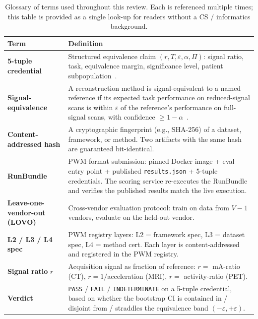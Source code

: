 \documentclass[twoside,11pt]{article}
\begin{document}
\begin{table}[ht]
    \centering
    \small
    \setlength{\tabcolsep}{6pt}
    \begin{tabular}{lp{10cm}}
        \toprule
        \textbf{Term} & \textbf{Definition} \\
        \midrule
        \textbf{5-tuple credential}     & Structured equivalence claim $(r, T, \varepsilon, \alpha, \Pi)$: signal ratio, task, equivalence margin, significance level, patient subpopulation~\citep{ws2framework}. \\
        \textbf{Signal-equivalence}     & A reconstruction method is signal-equivalent to a named reference if its expected task performance on reduced-signal scans is within $\varepsilon$ of the reference's performance on full-signal scans, with confidence $\geq 1-\alpha$~\citep{ws2framework}. \\
        \textbf{Content-addressed hash} & A cryptographic fingerprint (e.g., SHA-256) of a dataset, framework, or method. Two artifacts with the same hash are guaranteed bit-identical. \\
        \textbf{RunBundle}              & PWM-format submission: pinned Docker image + eval entry point + published \texttt{results.json} + 5-tuple credentials. The scoring service re-executes the RunBundle and verifies the published results match the live execution. \\
        \textbf{Leave-one-vendor-out (LOVO)} & Cross-vendor evaluation protocol: train on data from $V - 1$ vendors, evaluate on the held-out vendor. \\
        \textbf{L2 / L3 / L4 spec}      & PWM registry layers: L2 = framework spec, L3 = dataset spec, L4 = method cert. Each layer is content-addressed and registered in the PWM registry. \\
        \textbf{Signal ratio} $r$       & Acquisition signal as fraction of reference: $r = $ mA-ratio (CT), $r = 1/$acceleration (MRI), $r = $ activity-ratio (PET). \\
        \textbf{Verdict}                & \texttt{PASS} / \texttt{FAIL} / \texttt{INDETERMINATE} on a 5-tuple credential, based on whether the bootstrap CI is contained in / disjoint from / straddles the equivalence band $(-\varepsilon, +\varepsilon)$. \\
        \bottomrule
    \end{tabular}
    \caption{Glossary of terms used throughout this review. Each is referenced multiple times; this table is provided as a single look-up for readers without a CS / informatics background.}
    \label{tab:glossary}
\end{table}
\end{document}
